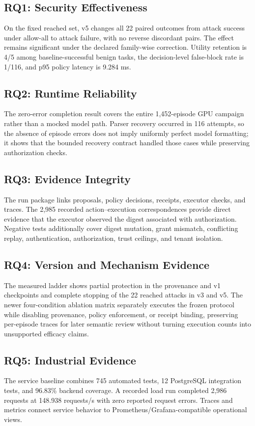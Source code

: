 \documentclass[10pt,twocolumn]{article}
\begin{document}
\subsection{RQ1: Security Effectiveness}
On the fixed reached set, v5 changes all 22 paired outcomes from attack success under allow-all to attack failure, with no reverse discordant pairs. The effect remains significant under the declared family-wise correction. Utility retention is 4/5 among baseline-successful benign tasks, the decision-level false-block rate is 1/116, and p95 policy latency is 9.284 ms.

\subsection{RQ2: Runtime Reliability}
The zero-error completion result covers the entire 1,452-episode GPU campaign rather than a mocked model path. Parser recovery occurred in 116 attempts, so the absence of episode errors does not imply uniformly perfect model formatting; it shows that the bounded recovery contract handled those cases while preserving authorization checks.

\subsection{RQ3: Evidence Integrity}
The run package links proposals, policy decisions, receipts, executor checks, and traces. The 2,985 recorded action--execution correspondences provide direct evidence that the executor observed the digest associated with authorization. Negative tests additionally cover digest mutation, grant mismatch, conflicting replay, authentication, authorization, trust ceilings, and tenant isolation.

\subsection{RQ4: Version and Mechanism Evidence}
The measured ladder shows partial protection in the provenance and v1 checkpoints and complete stopping of the 22 reached attacks in v3 and v5. The newer four-condition ablation matrix separately executes the frozen protocol while disabling provenance, policy enforcement, or receipt binding, preserving per-episode traces for later semantic review without turning execution counts into unsupported efficacy claims.

\subsection{RQ5: Industrial Evidence}
The service baseline combines 745 automated tests, 12 PostgreSQL integration tests, and 96.83\% backend coverage. A recorded load run completed 2,986 requests at 148.938 requests/s with zero reported request errors. Traces and metrics connect service behavior to Prometheus/Grafana-compatible operational views.
\end{document}
